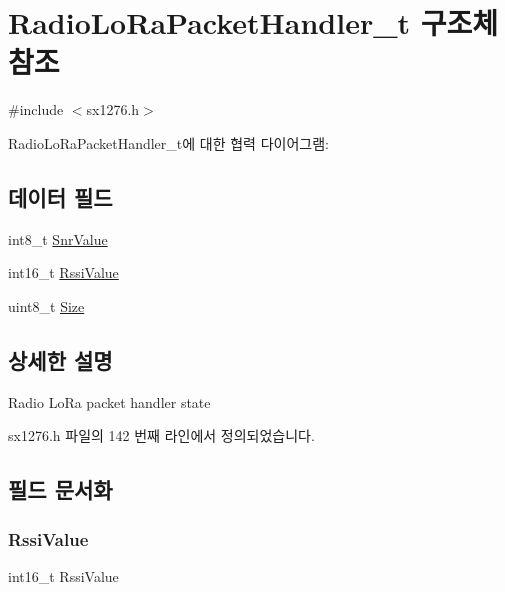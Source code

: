 \hypertarget{struct_radio_lo_ra_packet_handler__t}{}\section{Radio\+Lo\+Ra\+Packet\+Handler\+\_\+t 구조체 참조}
\label{struct_radio_lo_ra_packet_handler__t}


{\ttfamily \#include $<$sx1276.\+h$>$}



Radio\+Lo\+Ra\+Packet\+Handler\+\_\+t에 대한 협력 다이어그램\+:
\subsection*{데이터 필드}
\begin{DoxyCompactItemize}
\item 
int8\+\_\+t \mbox{\hyperlink{struct_radio_lo_ra_packet_handler__t_a0134b918a4d25b7c7c061c18e910ccde}{Snr\+Value}}
\item 
int16\+\_\+t \mbox{\hyperlink{struct_radio_lo_ra_packet_handler__t_aafc30dbc0517ce2a3e0717825c773037}{Rssi\+Value}}
\item 
uint8\+\_\+t \mbox{\hyperlink{struct_radio_lo_ra_packet_handler__t_ace31de7598e85e87624c4e7d8e5d112c}{Size}}
\end{DoxyCompactItemize}


\subsection{상세한 설명}
Radio Lo\+Ra packet handler state 

sx1276.\+h 파일의 142 번째 라인에서 정의되었습니다.



\subsection{필드 문서화}
\mbox{\label{struct_radio_lo_ra_packet_handler__t_aafc30dbc0517ce2a3e0717825c773037}} 
\subsubsection{\texorpdfstring{Rssi\+Value}{RssiValue}}
{\footnotesize\ttfamily int16\+\_\+t Rssi\+Value}



